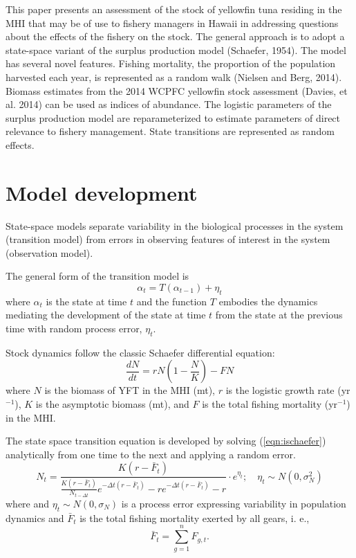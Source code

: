 \documentclass[12pt,letterpaper]{article}
\newcommand\peryr{yr$^{-1}$}
\begin{document}
This paper presents an assessment of the stock of yellowfin tuna
residing in the MHI that may be of use to fishery managers in Hawaii
in addressing questions about the effects of the fishery on the
stock. The general approach is to adopt a state-space variant of
the surplus production model  (Schaefer, 1954). 
The model has several novel features.
Fishing mortality, the proportion of the population harvested each
year, is represented as a random walk (Nielsen and Berg, 2014).
Biomass estimates from the 2014 WCPFC yellowfin stock assessment
(Davies, et al. 2014) can be used as indices of abundance.
The logistic parameters of the surplus production model are
reparameterized to estimate parameters of direct relevance to fishery
management. State transitions are represented as random effects.


\section*{Model development}
\label{sec:models}
State-space models separate variability in the biological
processes in the system (transition model)
from errors in observing features of interest
in the system (observation model).

The general form of the transition model is
\begin{equation}
\alpha_t=T(\alpha_{t-1}) + \eta_t
\end{equation}
where $\alpha_t$ is the state at time $t$ and 
the function $T$ embodies the dynamics mediating the
development of the state at time $t$ from the state at the previous
time with random process error, $\eta_t$.

Stock dynamics follow the classic Schaefer differential equation:
\begin{equation}
\label{eqn:ischaefer}
\frac{dN}{dt} = rN(1-\frac{N}{K}) - FN
\end{equation}
where $N$ is the biomass of YFT in the MHI (mt), 
$r$ is the logistic growth rate (\peryr),
$K$ is the asymptotic biomass (mt), and
$F$ is the total fishing mortality (\peryr) in the MHI.

The state space transition equation is developed by solving
(\ref{eqn:ischaefer}) analytically from one time to the next and
applying a random error.
\begin{equation}
\label{eqn:intschaeferA}
N_t = \frac{K(r-\bar{F}_t)}{\frac{K(r-\bar{F}_t)}{N_{t-\Delta t}}e^{-\Delta
t(r-\bar{F}_t)}-re^{-\Delta t(r-\bar{F}_t)} -r} \cdot e^{\eta_t};
\quad \eta_t\sim N(0,\sigma^2_N)
\end{equation}
where 
and $\eta_t \sim N(0,\sigma_N)$ is a process error expressing
variability in population dynamics
and $\bar{F}_t$ is the total fishing mortality exerted by all gears, i. e.,
$$
\bar{F}_t =\sum_{g=1}^n F_{g,t}.
$$
\end{document}
